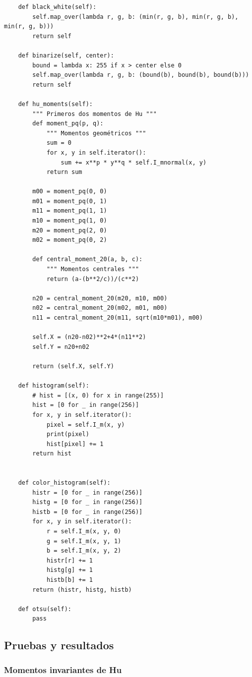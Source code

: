 \documentclass[letter]{article}
\begin{document}
\begin{verbatim}
    def black_white(self):
        self.map_over(lambda r, g, b: (min(r, g, b), min(r, g, b), min(r, g, b)))
        return self

    def binarize(self, center):
        bound = lambda x: 255 if x > center else 0
        self.map_over(lambda r, g, b: (bound(b), bound(b), bound(b)))
        return self

    def hu_moments(self):
        """ Primeros dos momentos de Hu """
        def moment_pq(p, q):
            """ Momentos geométricos """
            sum = 0
            for x, y in self.iterator():
                sum += x**p * y**q * self.I_mnormal(x, y)
            return sum

        m00 = moment_pq(0, 0)
        m01 = moment_pq(0, 1)
        m11 = moment_pq(1, 1)
        m10 = moment_pq(1, 0)
        m20 = moment_pq(2, 0)
        m02 = moment_pq(0, 2)

        def central_moment_20(a, b, c):
            """ Momentos centrales """
            return (a-(b**2/c))/(c**2)

        n20 = central_moment_20(m20, m10, m00)
        n02 = central_moment_20(m02, m01, m00)
        n11 = central_moment_20(m11, sqrt(m10*m01), m00)

        self.X = (n20-n02)**2+4*(n11**2)
        self.Y = n20+n02

        return (self.X, self.Y)

    def histogram(self):
        # hist = [(x, 0) for x in range(255)]
        hist = [0 for _ in range(256)]
        for x, y in self.iterator():
            pixel = self.I_m(x, y)
            print(pixel)
            hist[pixel] += 1
        return hist


    def color_histogram(self):
        histr = [0 for _ in range(256)]
        histg = [0 for _ in range(256)]
        histb = [0 for _ in range(256)]
        for x, y in self.iterator():
            r = self.I_m(x, y, 0)
            g = self.I_m(x, y, 1)
            b = self.I_m(x, y, 2)
            histr[r] += 1
            histg[g] += 1
            histb[b] += 1
        return (histr, histg, histb)

    def otsu(self):
        pass
\end{verbatim}
\subsection{Pruebas y resultados}
\label{sec:org311d3d5}
\subsubsection{Momentos invariantes de Hu}
\label{sec:org7a3f911}
\end{document}
